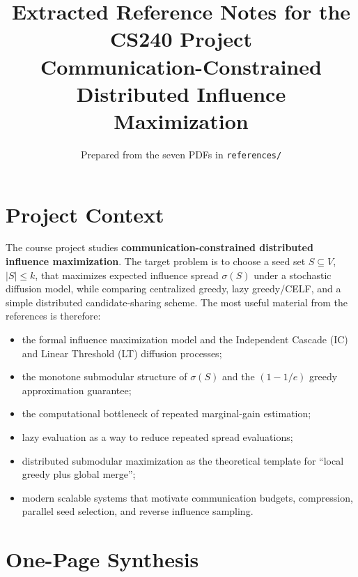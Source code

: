 \documentclass[10pt]{article}
\title{\textbf{Extracted Reference Notes for the CS240 Project}\\
Communication-Constrained Distributed Influence Maximization}
\author{Prepared from the seven PDFs in \texttt{references/}}
\date{}
\begin{document}
\maketitle

\section{Project Context}

The course project studies \textbf{communication-constrained distributed influence
maximization}.  The target problem is to choose a seed set
$S\subseteq V$, $|S|\le k$, that maximizes expected influence spread
$\sigma(S)$ under a stochastic diffusion model, while comparing centralized
greedy, lazy greedy/CELF, and a simple distributed candidate-sharing scheme.
The most useful material from the references is therefore:
\begin{itemize}
\item the formal influence maximization model and the Independent Cascade (IC)
and Linear Threshold (LT) diffusion processes;
\item the monotone submodular structure of $\sigma(S)$ and the
$(1-1/e)$ greedy approximation guarantee;
\item the computational bottleneck of repeated marginal-gain estimation;
\item lazy evaluation as a way to reduce repeated spread evaluations;
\item distributed submodular maximization as the theoretical template for
``local greedy plus global merge'';
\item modern scalable systems that motivate communication budgets, compression,
parallel seed selection, and reverse influence sampling.
\end{itemize}

\section{One-Page Synthesis}
\end{document}

